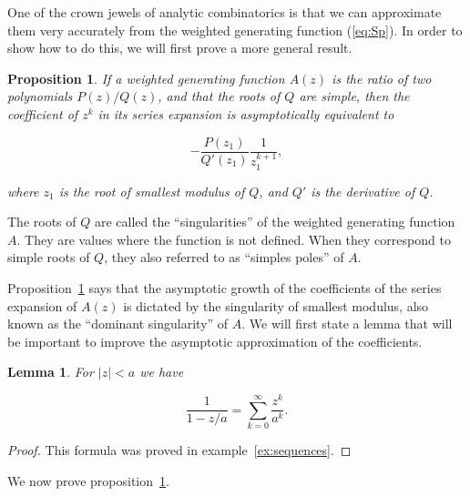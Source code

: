 \documentclass{article}
\newtheorem{lemma}{Lemma}
\newtheorem{proposition}{Proposition}
\begin{document}
One of the crown jewels of analytic combinatorics is that we can
approximate them very accurately from the weighted generating function
(\ref{eq:Sp}). In order to show how to do this, we will first prove a more
general result.

\begin{proposition}
\label{th:ass}
If a weighted generating function $A(z)$ is the ratio of two polynomials
$P(z)/Q(z)$, and that the roots of $Q$ are simple, then the coefficient of
$z^k$ in its series expansion is asymptotically equivalent to

\begin{equation}
\label{eq:ass}
-\frac{P(z_1)}{Q'(z_1)}\frac{1}{z_1^{k+1}},
\end{equation}

\noindent
where $z_1$ is the root of smallest modulus of $Q$,
and $Q'$ is the derivative of $Q$.
\end{proposition}

The roots of $Q$ are called the ``singularities'' of the weighted
generating function $A$. They are values where the function is not
defined. When they correspond to simple roots of $Q$, they also referred
to as ``simples poles'' of $A$.

Proposition~\ref{th:ass} says that the asymptotic growth of the
coefficients of the series expansion of $A(z)$ is dictated by the
singularity of smallest modulus, also known as the ``dominant
singularity'' of $A$. We will first state a lemma that will be
important to improve the asymptotic approximation of the coefficients.

\begin{lemma}
\label{lemma:poles}
For $|z| < a$ we have

\begin{equation}
\label{eq:poles}
\frac{1}{1-z/a} = \sum_{k=0}^\infty \frac{z^k}{a^k}.
\end{equation}
\end{lemma}

\begin{proof}
This formula was proved in example~\ref{ex:sequences}.
\end{proof}

We now prove proposition~\ref{th:ass}.
\end{document}
